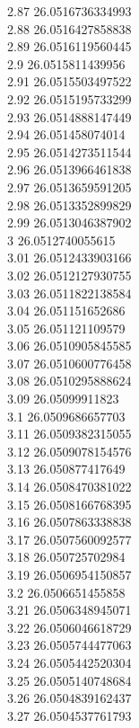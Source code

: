 {2.87	26.0516736334993\\
2.88	26.0516427858838\\
2.89	26.0516119560445\\
2.9	26.0515811439956\\
2.91	26.0515503497522\\
2.92	26.0515195733299\\
2.93	26.0514888147449\\
2.94	26.051458074014\\
2.95	26.0514273511544\\
2.96	26.0513966461838\\
2.97	26.0513659591205\\
2.98	26.0513352899829\\
2.99	26.0513046387902\\
3	26.0512740055615\\
3.01	26.0512433903166\\
3.02	26.0512127930755\\
3.03	26.0511822138584\\
3.04	26.051151652686\\
3.05	26.051121109579\\
3.06	26.0510905845585\\
3.07	26.0510600776458\\
3.08	26.0510295888624\\
3.09	26.05099911823\\
3.1	26.0509686657703\\
3.11	26.0509382315055\\
3.12	26.0509078154576\\
3.13	26.050877417649\\
3.14	26.0508470381022\\
3.15	26.0508166768395\\
3.16	26.0507863338838\\
3.17	26.0507560092577\\
3.18	26.050725702984\\
3.19	26.0506954150857\\
3.2	26.0506651455858\\
3.21	26.0506348945071\\
3.22	26.0506046618729\\
3.23	26.0505744477063\\
3.24	26.0505442520304\\
3.25	26.0505140748684\\
3.26	26.0504839162437\\
3.27	26.0504537761793\\
}
